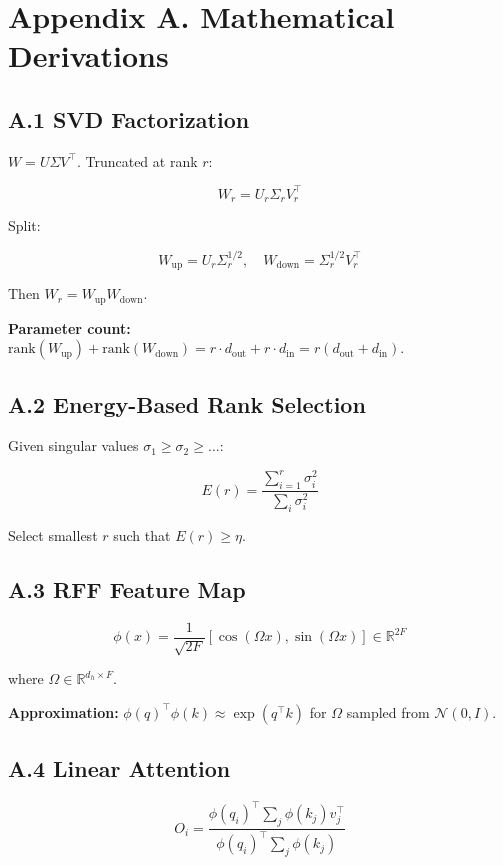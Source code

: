 
\section{Appendix A. Mathematical Derivations}

\subsection{A.1 SVD Factorization}

$W = U \Sigma V^\top$. Truncated at rank $r$:

\[
W_r = U_r \Sigma_r V_r^\top
\]

Split:

\[
W_\text{up} = U_r \Sigma_r^{1/2}, \quad W_\text{down} = \Sigma_r^{1/2} V_r^\top
\]

Then $W_r = W_\text{up} W_\text{down}$.

\textbf{Parameter count:} $\text{rank}(W_\text{up}) + \text{rank}(W_\text{down}) = r \cdot d_\text{out} + r \cdot d_\text{in} = r(d_\text{out} + d_\text{in})$.

\subsection{A.2 Energy-Based Rank Selection}

Given singular values $\sigma_1 \geq \sigma_2 \geq \dots$:

\[
E(r) = \frac{\sum_{i=1}^{r} \sigma_i^2}{\sum_i \sigma_i^2}
\]

Select smallest $r$ such that $E(r) \geq \eta$.

\subsection{A.3 RFF Feature Map}

\[
\phi(x) = \frac{1}{\sqrt{2F}} [\cos(\Omega x), \sin(\Omega x)] \in \mathbb{R}^{2F}
\]

where $\Omega \in \mathbb{R}^{d_h \times F}$.

\textbf{Approximation:} $\phi(q)^\top \phi(k) \approx \exp(q^\top k)$ for 
$\Omega$ sampled from $\mathcal{N}(0, I)$.

\subsection{A.4 Linear Attention}

\[
O_i = \frac{\phi(q_i)^\top \sum_j \phi(k_j) v_j^\top}{\phi(q_i)^\top \sum_j \phi(k_j)}
\]

